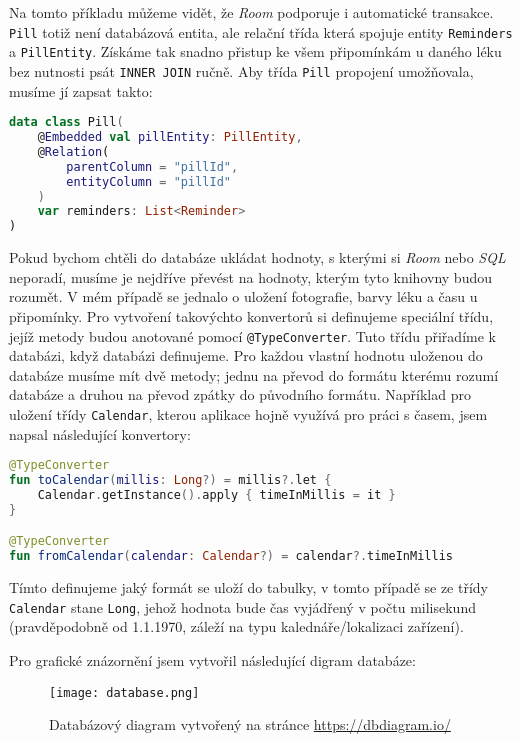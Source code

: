 \documentclass[../TakeYourPill.tex]{subfiles}
\begin{document}
Na tomto příkladu můžeme vidět, že \textit{Room} podporuje i automatické transakce. \texttt{Pill} totiž není databázová entita, ale relační třída která spojuje entity \texttt{Reminders} a \texttt{PillEntity}. Získáme tak snadno přistup ke všem připomínkám u daného léku bez nutnosti psát \texttt{INNER JOIN} ručně. Aby třída \texttt{Pill} propojení umožňovala, musíme jí zapsat takto:

\setmonofont{JetBrains Mono}
\begin{lstlisting}[language=Kotlin]
data class Pill(
    @Embedded val pillEntity: PillEntity,
    @Relation(
        parentColumn = "pillId",
        entityColumn = "pillId"
    )
    var reminders: List<Reminder>
)
\end{lstlisting}
\setmonofont{Latin Modern Mono}

Pokud bychom chtěli do databáze ukládat hodnoty, s kterými si \textit{Room} nebo \textit{SQL} neporadí, musíme je nejdříve převést na hodnoty, kterým tyto knihovny budou rozumět. V mém případě se jednalo o uložení fotografie, barvy léku a času u připomínky. Pro vytvoření takovýchto konvertorů si definujeme speciální třídu, jejíž metody budou anotované pomocí \texttt{@TypeConverter}. Tuto třídu přiřadíme k databázi, když databázi definujeme. Pro každou vlastní hodnotu uloženou do databáze musíme mít dvě metody; jednu na převod do formátu kterému rozumí databáze a druhou na převod zpátky do původního formátu. Například pro uložení třídy \texttt{Calendar}, kterou aplikace hojně využívá pro práci s časem, jsem napsal následující konvertory:

\begin{minipage}{\linewidth}
\setmonofont{JetBrains Mono}
\begin{lstlisting}[language=Kotlin]
@TypeConverter
fun toCalendar(millis: Long?) = millis?.let {
    Calendar.getInstance().apply { timeInMillis = it }
}

@TypeConverter
fun fromCalendar(calendar: Calendar?) = calendar?.timeInMillis
\end{lstlisting}
\setmonofont{Latin Modern Mono}
\end{minipage}

Tímto definujeme jaký formát se uloží do tabulky, v tomto případě se ze třídy \texttt{Calendar} stane \texttt{Long}, jehož hodnota bude čas vyjádřený v počtu milisekund (pravděpodobně od 1.1.1970, záleží na typu kalednáře/lokalizaci zařízení). 

Pro grafické znázornění jsem vytvořil následující digram databáze:

\begin{figure}[h]
\centering
\texttt{[image: database.png]}
\caption{Databázový diagram vytvořený na stránce \url{https://dbdiagram.io/}}
\end{figure}
\end{document}
